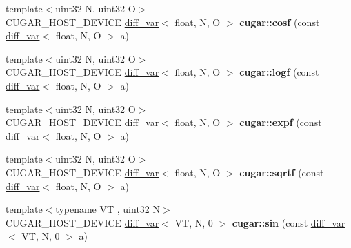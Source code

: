 \begin{DoxyCompactItemize}
\item 
\mbox{\label{group___auto_diff_module_gab1649e96e0c78a021745c61c94c7cd1d}} 
{\footnotesize template$<$uint32 N, uint32 O$>$ }\\C\+U\+G\+A\+R\+\_\+\+H\+O\+S\+T\+\_\+\+D\+E\+V\+I\+CE \hyperlink{structcugar_1_1diff__var}{diff\+\_\+var}$<$ float, N, O $>$ {\bfseries cugar\+::cosf} (const \hyperlink{structcugar_1_1diff__var}{diff\+\_\+var}$<$ float, N, O $>$ a)
\item 
\mbox{\label{group___auto_diff_module_ga19dc5d34761356e2d836d0a3da9b9a8c}} 
{\footnotesize template$<$uint32 N, uint32 O$>$ }\\C\+U\+G\+A\+R\+\_\+\+H\+O\+S\+T\+\_\+\+D\+E\+V\+I\+CE \hyperlink{structcugar_1_1diff__var}{diff\+\_\+var}$<$ float, N, O $>$ {\bfseries cugar\+::logf} (const \hyperlink{structcugar_1_1diff__var}{diff\+\_\+var}$<$ float, N, O $>$ a)
\item 
\mbox{\label{group___auto_diff_module_gadd25ae967ab51b34913cf9eb2427b0fa}} 
{\footnotesize template$<$uint32 N, uint32 O$>$ }\\C\+U\+G\+A\+R\+\_\+\+H\+O\+S\+T\+\_\+\+D\+E\+V\+I\+CE \hyperlink{structcugar_1_1diff__var}{diff\+\_\+var}$<$ float, N, O $>$ {\bfseries cugar\+::expf} (const \hyperlink{structcugar_1_1diff__var}{diff\+\_\+var}$<$ float, N, O $>$ a)
\item 
\mbox{\label{group___auto_diff_module_ga82b990ff4cfa88eb36e8dbc703c57334}} 
{\footnotesize template$<$uint32 N, uint32 O$>$ }\\C\+U\+G\+A\+R\+\_\+\+H\+O\+S\+T\+\_\+\+D\+E\+V\+I\+CE \hyperlink{structcugar_1_1diff__var}{diff\+\_\+var}$<$ float, N, O $>$ {\bfseries cugar\+::sqrtf} (const \hyperlink{structcugar_1_1diff__var}{diff\+\_\+var}$<$ float, N, O $>$ a)
\item 
\mbox{\label{group___auto_diff_module_ga907156650181d419a7ef277dc3c40d3c}} 
{\footnotesize template$<$typename VT , uint32 N$>$ }\\C\+U\+G\+A\+R\+\_\+\+H\+O\+S\+T\+\_\+\+D\+E\+V\+I\+CE \hyperlink{structcugar_1_1diff__var}{diff\+\_\+var}$<$ VT, N, 0 $>$ {\bfseries cugar\+::sin} (const \hyperlink{structcugar_1_1diff__var}{diff\+\_\+var}$<$ VT, N, 0 $>$ a)
\item 

\end{DoxyCompactItemize}

